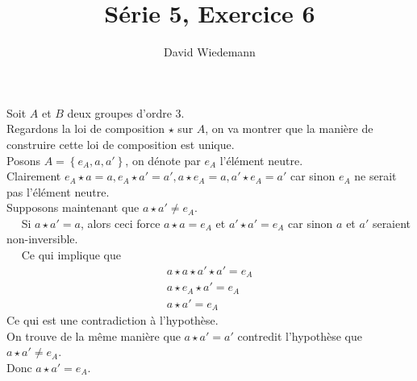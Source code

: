 \documentclass[11pt, a4paper, twoside]{article}
\begin{document}
\title{Série 5, Exercice 6}
\author{David Wiedemann}
\maketitle
Soit $A$ et $B$ deux groupes d'ordre 3.\\
Regardons la loi de composition $\star$ sur $A$, on va montrer que la manière de construire cette loi de composition est unique.\\

Posons $A= \left\{ e_A, a, a' \right\} $, on dénote par $e_A$ l'élément neutre.\\
Clairement $e_A \star a = a, e_A \star a'= a', a \star e_A = a, a' \star e_A = a'$ car sinon $e_A$ ne serait pas l'élément neutre.\\
Supposons maintenant que $a \star a' \neq e_A$.\\
$\quad$ Si $a \star a' = a$, alors ceci force $a \star a = e_A $ et $a' \star a' = e_A $ car sinon $a$ et $a'$ seraient non-inversible.\\
$\quad$ Ce qui implique que
\begin{align*}
a \star a \star a' \star a' = e_A\\
a \star e_A \star a' = e_A\\
a \star a' = e_A
\end{align*}
Ce qui est une contradiction à l'hypothèse.\\

On trouve de la même manière que $a \star a' =a'$ contredit l'hypothèse que $a\star a'\neq e_A$.\\

Donc $a \star a' = e_A$.\\
\end{document}
